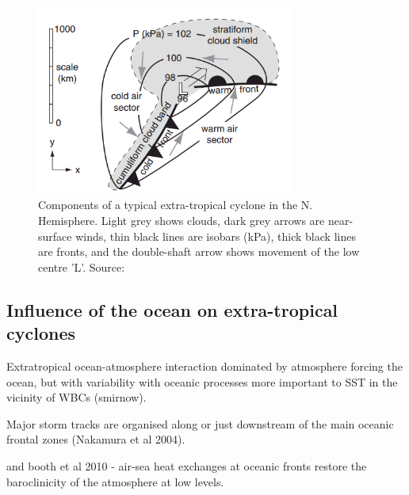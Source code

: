 \begin{figure}[h]
	\centering
	\noindent\includegraphics[width=20pc,angle=0]{ET_structure.png}
	\caption{Components of a typical extra-tropical cyclone in the N. Hemisphere. Light grey shows clouds, dark grey arrows are near-surface winds, thin black lines are isobars (kPa), thick black lines are fronts, and the double-shaft arrow shows movement of the low centre 'L'. Source: \cite{stull} }\label{fig:ET_structure}
\end{figure}



\subsection{Influence of the ocean on extra-tropical cyclones} \label{etc_ocean}


Extratropical ocean-atmosphere interaction dominated by atmosphere forcing the ocean, but with variability with oceanic processes more important to SST in the vicinity of WBCs (smirnow).

Major storm tracks are organised along or just downstream of the main oceanic frontal zones (Nakamura et al 2004).

\cite{nakamura2008importance} and booth et al 2010 - air-sea heat exchanges at oceanic fronts restore the baroclinicity of the atmosphere at low levels.

